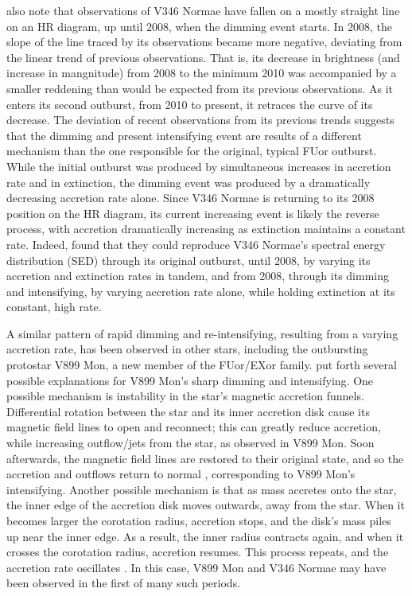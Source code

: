 \documentclass[iop,apj,tighten]{emulateapj}
\begin{document}
\cite{kospal2017brightness} also note that observations of V346 Normae have fallen on a mostly straight line on an HR diagram, up until 2008, when the dimming event starts. In 2008, the slope of the line traced by its observations became more negative, deviating from the linear trend of previous observations. That is, its decrease in brightness (and increase in mangnitude) from 2008 to the minimum 2010 was accompanied by a smaller reddening than would be expected from its previous observations. As it enters its second outburst, from 2010 to present, it retraces the curve of its decrease. The deviation of recent observations from its previous trends suggests that the dimming and present intensifying event are results of a different mechanism than the one responsible for the original, typical FUor outburst. While the initial outburst was produced by simultaneous increases in accretion rate and in extinction, the dimming event was produced by a dramatically decreasing accretion rate alone. Since V346 Normae is returning to its 2008 position on the HR diagram, its current increasing event is likely the reverse process, with accretion dramatically increasing as extinction maintains a constant rate. Indeed, \cite{kospal2017brightness} found that they could reproduce V346 Normae's spectral energy distribution (SED) through its original outburst, until 2008, by varying its accretion and extinction rates in tandem, and from 2008, through its dimming and intensifying, by varying accretion rate alone, while holding extinction at its constant, high rate.

A similar pattern of rapid dimming and re-intensifying, resulting from a varying accretion rate, has been observed in other stars, including the outbursting protostar V899 Mon, a new member of the FUor/EXor family. \cite{ninan2015v899} put forth several possible explanations for V899 Mon's sharp dimming and intensifying. One possible mechanism is instability in the star's magnetic accretion funnels. Differential rotation between the star and its inner accretion disk cause its magnetic field lines to open and reconnect; this can greatly reduce accretion, while increasing outflow/jets from the star, as observed in V899 Mon. Soon afterwards, the magnetic field lines are restored to their original state, and so the accretion and outflows return to normal \citep{bouvier2003eclipses}, corresponding to V899 Mon's intensifying. Another possible mechanism is that as mass accretes onto the star, the inner edge of the accretion disk moves outwards, away from the star. When it becomes larger the corotation radius, accretion stops, and the disk's mass piles up near the inner edge. As a result, the inner radius contracts again, and when it crosses the corotation radius, accretion resumes. This process repeats, and the accretion rate oscillates \citep{d2010episodic}. In this case, V899 Mon and V346 Normae may have been observed in the first of many such periods.
\end{document}
